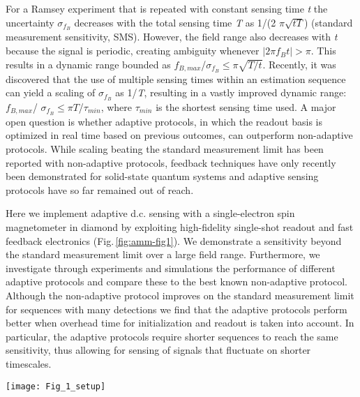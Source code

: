 For a Ramsey experiment that is repeated with constant sensing time \textit{t} the uncertainty $\sigma_{f_B}$ decreases with the total sensing time \textit{T} as 1/(2 $\pi \sqrt{tT}$) (standard measurement sensitivity, SMS).  However, the field range also decreases with \textit{t} because the signal is periodic, creating ambiguity whenever $|2\pi f_B t| > \pi $. This results in a dynamic range bounded as  $f_{B,max}$/$\sigma_{f_B}  \le \pi \sqrt{T/t}$.  Recently, it was discovered that the use of multiple sensing times within an estimation sequence can yield a scaling of $\sigma_{f_B}$ as 1/\textit{T}, resulting in a vastly improved dynamic range: $f_{B,max}$/ $\sigma_{f_B} \le  \pi T $/$ \tau_{min}$, where $\tau_{min}$ is the shortest sensing time used. A major open question is whether adaptive protocols, in which the readout basis is optimized in real time based on previous outcomes, can outperform non-adaptive protocols. While scaling beating the standard measurement limit has been reported with non-adaptive protocols\cite{Waldherr_NatNano_2012,Nusran_NatNano_2012}, feedback techniques have only recently been demonstrated for solid-state quantum systems\cite{Vijay_Nature_2012,Blok_NatPhys_2014,Shulman_NatCommun_2014} and adaptive sensing protocols have so far remained out of reach.


Here we implement adaptive d.c. sensing with a single-electron spin magnetometer in diamond by exploiting high-fidelity single-shot readout and fast feedback electronics (Fig.\,\ref{fig:amm-fig1}). We demonstrate a sensitivity beyond the standard measurement limit over a large field range. Furthermore, we investigate through experiments and simulations the performance of different adaptive protocols and compare these to the best known non-adaptive protocol. Although the non-adaptive protocol improves on the standard measurement limit for sequences with many detections we find that the adaptive protocols perform better when overhead time for initialization and readout is taken into account. In particular, the adaptive protocols require shorter sequences to reach the same sensitivity, thus allowing for sensing of signals that fluctuate on shorter timescales.

\begin{figure*}
	\centering
	\texttt{[image: Fig\_1\_setup]}
	\caption{\label{fig:amm-fig1} \textbf{Experiment concept and apparatus.} The adaptive frequency estimation protocol consists of a sequence of initialization, sensing, measurement operations. After each measurement run, the outcome $\mu$ is used to update the estimate of the frequency $f_B$, which is then used to optimize the sensing parameters for the following run. Experimentally, the frequency estimation and adaptive calculation of the phase are performed in real-time by a microprocessor.}
\end{figure*}

